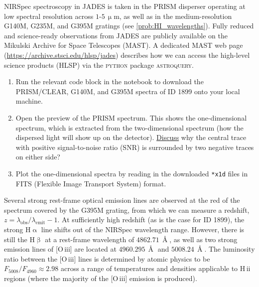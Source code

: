 \documentclass{article}
\newcommand{\HII}{\hbox{H\,{\sc ii}}\xspace}
\newcommand{\OIII}{\hbox{[O\,{\sc iii}]}\xspace}
\newcommand{\Halpha}{\ensuremath{\mathrm{H}\upalpha}\xspace}
\newcommand{\Hbeta}{\ensuremath{\mathrm{H}\upbeta}\xspace}
\theoremstyle{definition}
\begin{document}
NIRSpec spectroscopy in JADES is taken in the PRISM disperser operating at low spectral resolution across $1$-$5 \, \mathrm{\upmu m}$, as well as in the medium-resolution G140M, G235M, and G395M gratings (see \cref{prob:HI_wavelengths}). Fully reduced and science-ready observations from JADES are publicly available on the Mikulski Archive for Space Telescopes (MAST). A dedicated MAST web page (\url{https://archive.stsci.edu/hlsp/jades}) describes how we can access the high-level science products (HLSP) via the \textsc{python} package \textsc{astroquery}.
\begin{enumerate}[label=(\alph*)]
    \item Run the relevant code block in the notebook to download the PRISM/CLEAR, G140M, and G395M spectra of ID 1899 onto your local machine.
    \item Open the preview of the PRISM spectrum. This shows the one-dimensional spectrum, which is extracted from the two-dimensional spectrum (how the dispersed light will show up on the detector). \underline{Discuss} why the central trace with positive signal-to-noise ratio (SNR) is surrounded by two negative traces on either side?
    \item Plot the one-dimensional spectra by reading in the downloaded \texttt{*x1d} files in FITS (Flexible Image Transport System) format.
\end{enumerate}

Several strong rest-frame optical emission lines are observed at the red of the spectrum covered by the G395M grating, from which we can measure a redshift, $z = \lambda_\mathrm{obs}/\lambda_\mathrm{emit} - 1$. At sufficiently high redshift (as is the case for ID 1899), the strong \Halpha line shifts out of the NIRSpec wavelength range. However, there is still the \Hbeta at a rest-frame wavelength of $4862.71 \, \Angstrom$, as well as two strong emission lines of \OIII are located at $4960.295 \, \Angstrom$ and $5008.24 \, \Angstrom$. The luminosity ratio between the \OIII lines is determined by atomic physics to be $F_{5008}/F_{4960} \approx 2.98$ across a range of temperatures and densities applicable to \HII regions (where the majority of the \OIII emission is produced).
\end{document}
